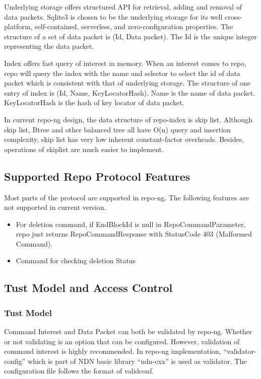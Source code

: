 \documentclass{acm_proc_article-sp}
\begin{document}
Underlying storage offers structured API for retrieval, adding and removal of data packets. Sqlite3 is chosen to be the underlying storage for its well cross-platform, self-contained, serverless, and zero-configuration properties. The structure of a set of data packet is (Id, Data packet). The Id is the unique integer representing the data packet.

Index offers fast query of interest in memory. When an interest comes to repo, repo will query the index with the name and selector to select the id of data packet which is consistent with that of underlying storage. The structure of one entry of index is (Id, Name, KeyLocatorHash). Name is the name of data packet. KeyLocatorHash is the hash of key locator of data packet.

In current repo-ng design, the data structure of repo-index is skip list. \cite{pugh1990skip} Although skip list, Btree and other balanced tree all have O(n) query and insertion complexity, skip list has very low inherent constant-factor overheads. Besides, operations of skiplist are much easier to implement.


\subsection{Supported Repo Protocol Features}
Most parts of the protocol are supported in repo-ng. The following features are not supported in current version.

\begin{itemize}

\item For deletion command, if EndBlockId is null in RepoCommandParameter, repo just returns RepoCommandResponse with StatusCode 403 (Malformed Command).

\item Command for checking deletion Status

\end{itemize}

\subsection{Tust Model and Access Control}

\subsubsection{Tust Model}

Command Interest and Data Packet can both be validated by repo-ng. Whether or not validating is an option that can be configured. However, validation of command interest is highly recommended. In repo-ng implementation, ``validator-config'' which is part of NDN basic library ``ndn-cxx'' is used as validator. The configuration file follows the format of validconf. \cite{validconf}
\end{document}
